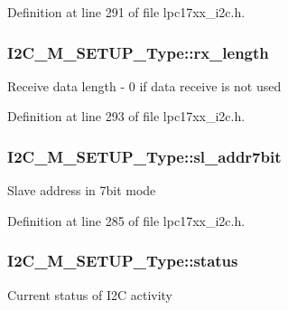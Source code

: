 Definition at line 291 of file lpc17xx\+\_\+i2c.\+h.

\subsubsection[{\texorpdfstring{rx\+\_\+length}{rx_length}}]{ I2\+C\+\_\+\+M\+\_\+\+S\+E\+T\+U\+P\+\_\+\+Type\+::rx\+\_\+length}\hypertarget{struct_i2_c___m___s_e_t_u_p___type_a9bbc3df52a3571f128b818e38b9ce96f}{}\label{struct_i2_c___m___s_e_t_u_p___type_a9bbc3df52a3571f128b818e38b9ce96f}
Receive data length -\/ 0 if data receive is not used 

Definition at line 293 of file lpc17xx\+\_\+i2c.\+h.

\subsubsection[{\texorpdfstring{sl\+\_\+addr7bit}{sl_addr7bit}}]{ I2\+C\+\_\+\+M\+\_\+\+S\+E\+T\+U\+P\+\_\+\+Type\+::sl\+\_\+addr7bit}\hypertarget{struct_i2_c___m___s_e_t_u_p___type_a369581824a6baea2ab236b32d3d51062}{}\label{struct_i2_c___m___s_e_t_u_p___type_a369581824a6baea2ab236b32d3d51062}
Slave address in 7bit mode 

Definition at line 285 of file lpc17xx\+\_\+i2c.\+h.

\subsubsection[{\texorpdfstring{status}{status}}]{ I2\+C\+\_\+\+M\+\_\+\+S\+E\+T\+U\+P\+\_\+\+Type\+::status}\hypertarget{struct_i2_c___m___s_e_t_u_p___type_aee964d65fc6f579feedcd276b833777f}{}\label{struct_i2_c___m___s_e_t_u_p___type_aee964d65fc6f579feedcd276b833777f}
Current status of I2C activity 

